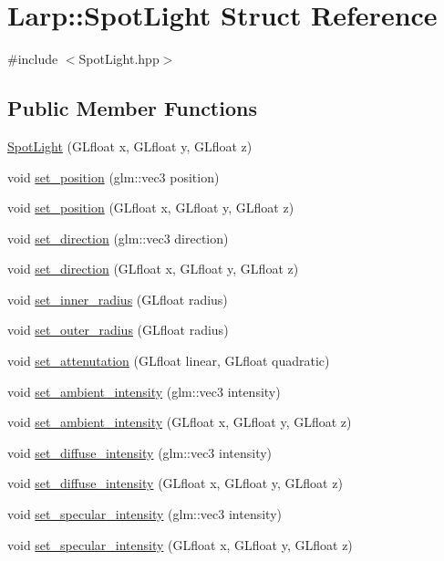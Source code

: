 \hypertarget{structLarp_1_1SpotLight}{}\section{Larp\+:\+:Spot\+Light Struct Reference}
\label{structLarp_1_1SpotLight}


{\ttfamily \#include $<$Spot\+Light.\+hpp$>$}

\subsection*{Public Member Functions}
\begin{DoxyCompactItemize}
\item 
\hyperlink{structLarp_1_1SpotLight_abf5dee0afd1596da9c0e8813f729c2b7}{Spot\+Light} (G\+Lfloat x, G\+Lfloat y, G\+Lfloat z)
\item 
void \hyperlink{structLarp_1_1SpotLight_aaa9d401b2b4cfac18d45ce81012056e6}{set\+\_\+position} (glm\+::vec3 position)
\item 
void \hyperlink{structLarp_1_1SpotLight_af01d416976e939d4ddd87b8ec54934b2}{set\+\_\+position} (G\+Lfloat x, G\+Lfloat y, G\+Lfloat z)
\item 
void \hyperlink{structLarp_1_1SpotLight_a47253a509962e0be20d7d4bb59010677}{set\+\_\+direction} (glm\+::vec3 direction)
\item 
void \hyperlink{structLarp_1_1SpotLight_adab154a7e12133a2fe6f71bb3d63a5a8}{set\+\_\+direction} (G\+Lfloat x, G\+Lfloat y, G\+Lfloat z)
\item 
void \hyperlink{structLarp_1_1SpotLight_a18104f736d19e11e1ee683b334c7c8d7}{set\+\_\+inner\+\_\+radius} (G\+Lfloat radius)
\item 
void \hyperlink{structLarp_1_1SpotLight_a4a9068786be5667c0f13575f156fdd37}{set\+\_\+outer\+\_\+radius} (G\+Lfloat radius)
\item 
void \hyperlink{structLarp_1_1SpotLight_a5998183bc38d7ee76efba1c6965e4b46}{set\+\_\+attenutation} (G\+Lfloat linear, G\+Lfloat quadratic)
\item 
void \hyperlink{structLarp_1_1SpotLight_a04612e00acc597033736746c5695c241}{set\+\_\+ambient\+\_\+intensity} (glm\+::vec3 intensity)
\item 
void \hyperlink{structLarp_1_1SpotLight_a6f7c7202abcbbdfceeb361118cf4c96e}{set\+\_\+ambient\+\_\+intensity} (G\+Lfloat x, G\+Lfloat y, G\+Lfloat z)
\item 
void \hyperlink{structLarp_1_1SpotLight_a56cb20bd2fedac655d3d0dccf209b1a4}{set\+\_\+diffuse\+\_\+intensity} (glm\+::vec3 intensity)
\item 
void \hyperlink{structLarp_1_1SpotLight_a89e8b239cfe202ff9da01a1d5c0371b4}{set\+\_\+diffuse\+\_\+intensity} (G\+Lfloat x, G\+Lfloat y, G\+Lfloat z)
\item 
void \hyperlink{structLarp_1_1SpotLight_a48c73c8637d206ef9838fbf31f5a5fd0}{set\+\_\+specular\+\_\+intensity} (glm\+::vec3 intensity)
\item 
void \hyperlink{structLarp_1_1SpotLight_ac6802771dee06e5a00e57f2cad494bea}{set\+\_\+specular\+\_\+intensity} (G\+Lfloat x, G\+Lfloat y, G\+Lfloat z)
\end{DoxyCompactItemize}
